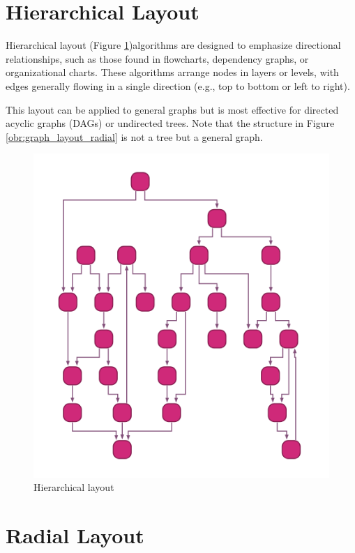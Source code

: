 \section{Hierarchical Layout}

Hierarchical layout (Figure \ref{obr:graph_layout_hierarchical})algorithms are designed to emphasize directional relationships, such as those found in flowcharts,
dependency graphs, or organizational charts. These algorithms arrange nodes in layers or levels, with edges generally
flowing in a single direction (e.g., top to bottom or left to right).

This layout can be applied to general graphs but is most effective for directed acyclic graphs (DAGs) or undirected trees.
Note that the structure in Figure \ref{obr:graph_layout_radial} is not a tree but a general graph.

\begin{figure}[p]\centering
    \includegraphics[width=140mm, keepaspectratio]{img/graph_layout_hiearchichal.png}
    \caption{Hierarchical layout\cite{graph_layout_demos}}
    \label{obr:graph_layout_hierarchical}
\end{figure}

\section{Radial Layout}

